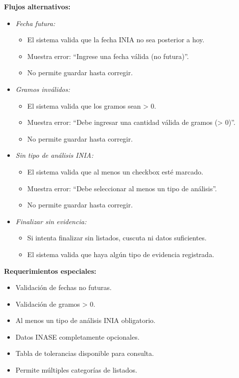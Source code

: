 \vspace{0.5em}
\noindent\textbf{Flujos alternativos:}
\begin{itemize}[nosep]
    \item \textit{Fecha futura:}
    \begin{itemize}[nosep]
        \item El sistema valida que la fecha INIA no sea posterior a hoy.
        \item Muestra error: ``Ingrese una fecha válida (no futura)''.
        \item No permite guardar hasta corregir.
    \end{itemize}
    \item \textit{Gramos inválidos:}
    \begin{itemize}[nosep]
        \item El sistema valida que los gramos sean > 0.
        \item Muestra error: ``Debe ingresar una cantidad válida de gramos (> 0)''.
        \item No permite guardar hasta corregir.
    \end{itemize}
    \item \textit{Sin tipo de análisis INIA:}
    \begin{itemize}[nosep]
        \item El sistema valida que al menos un checkbox esté marcado.
        \item Muestra error: ``Debe seleccionar al menos un tipo de análisis''.
        \item No permite guardar hasta corregir.
    \end{itemize}
    \item \textit{Finalizar sin evidencia:}
    \begin{itemize}[nosep]
        \item Si intenta finalizar sin listados, cuscuta ni datos suficientes.
        \item El sistema valida que haya algún tipo de evidencia registrada.
    \end{itemize}
\end{itemize}

\vspace{0.5em}
\noindent\textbf{Requerimientos especiales:}
\begin{itemize}[nosep]
    \item Validación de fechas no futuras.
    \item Validación de gramos > 0.
    \item Al menos un tipo de análisis INIA obligatorio.
    \item Datos INASE completamente opcionales.
    \item Tabla de tolerancias disponible para consulta.
    \item Permite múltiples categorías de listados.
\end{itemize}
